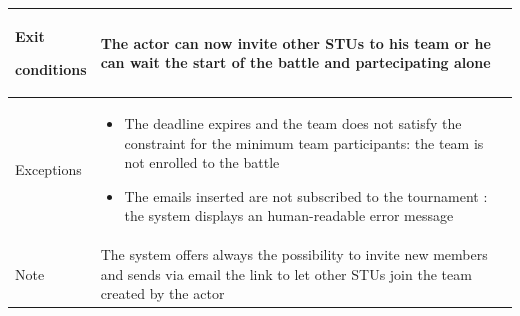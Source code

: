 \begin{center}
\begin{tabular}{| m{2cm} | m{10cm}|}
        Exit \par conditions  & The actor can now invite other STUs to his team or he can wait the start of the battle and partecipating alone                              \\ \hline
        Exceptions            & \begin{itemize} 
                                    \item The deadline expires and the team does not satisfy the constraint for the minimum team participants: the team is not enrolled to the battle 
                                    \item The emails inserted are not subscribed to the tournament : the system displays an human-readable error message    
                                \end{itemize} \\ \hline
        Note                  & The system offers always the possibility to invite new members and sends via email the link to let other STUs join the team created by the actor \\ \hline
    \end{tabular}
\end{center}

